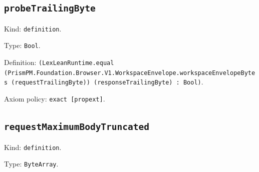 \documentclass[11pt]{article}
\begin{document}
\subsection*{\texttt{probeTrailingByte}}
\noindent Kind: \texttt{definition}.\par
\noindent Type: \texttt{Bool}.\par
\noindent Definition: \texttt{(LexLeanRuntime.equal (PrismPM.Foundation.Browser.V1.WorkspaceEnvelope.workspaceEnvelopeBytes (requestTrailingByte)) (responseTrailingByte) : Bool)}.\par
\noindent Axiom policy: \texttt{exact [propext]}.\par
\subsection*{\texttt{requestMaximumBodyTruncated}}
\noindent Kind: \texttt{definition}.\par
\noindent Type: \texttt{ByteArray}.\par
\end{document}
